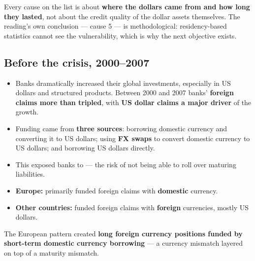 \begin{lrtrapbox}
Every cause on the list is about \textbf{where the dollars came from and how long they lasted}, not about the credit quality of the dollar assets themselves. The reading's own conclusion --- cause 5 --- is methodological: residency-based statistics cannot see the vulnerability, which is why the next objective exists.
\end{lrtrapbox}


\subsection{Before the crisis, 2000--2007}

\begin{itemize}
\item Banks dramatically increased their global investments, especially in US dollars and structured products. Between 2000 and 2007 banks' \textbf{foreign claims more than tripled}, with \textbf{US dollar claims a major driver} of the growth.
\item Funding came from \textbf{three sources}: borrowing domestic currency and converting it to US dollars; using \textbf{FX swaps} to convert domestic currency to US dollars; and borrowing US dollars directly.
\item This exposed banks to  --- the risk of not being able to roll over maturing liabilities.
\end{itemize}

\begin{lrkeybox}
\begin{itemize}
\item \textbf{Europe:} primarily funded foreign claims with \textbf{domestic} currency.
\item \textbf{Other countries:} funded foreign claims with \textbf{foreign} currencies, mostly US dollars.
\end{itemize}
The European pattern created \textbf{long foreign currency positions funded by short-term domestic currency borrowing} --- a currency mismatch layered on top of a maturity mismatch.
\end{lrkeybox}

